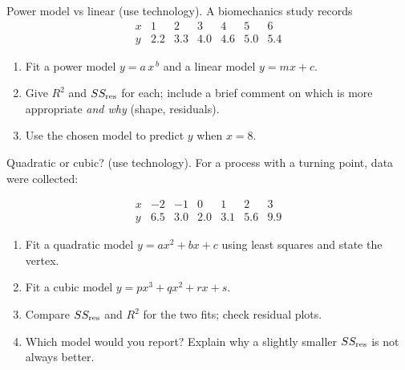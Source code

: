 \documentclass[11pt]{article}
\def\textbf#1{#1}%
\newcounter{question}
\begin{document}
\begin{question}
\textbf{Power model vs linear (use technology).}
A biomechanics study records
\[
\begin{array}{c|cccccc}
x & 1 & 2 & 3 & 4 & 5 & 6\\\hline
y & 2.2 & 3.3 & 4.0 & 4.6 & 5.0 & 5.4
\end{array}
\]
\begin{enumerate}
  \item Fit a power model $y=a\,x^{\,b}$ and a linear model $y=mx+c$.
  \item Give $R^2$ and $SS_{\rm res}$ for each; include a brief comment on which is more appropriate \emph{and why} (shape, residuals).
  \item Use the chosen model to predict $y$ when $x=8$.
\end{enumerate}

\begin{center}
\end{center}
\end{question}

\begin{question}
\textbf{Quadratic or cubic? (use technology).}
For a process with a turning point, data were collected:

\[
\begin{array}{c|cccccc}
x & -2 & -1 & 0 & 1 & 2 & 3\\\hline
y & 6.5 & 3.0 & 2.0 & 3.1 & 5.6 & 9.9
\end{array}
\]

\begin{enumerate}
  \item Fit a quadratic model $y=ax^2+bx+c$ using least squares and state the vertex.
  \item Fit a cubic model $y=px^3+qx^2+rx+s$.
  \item Compare $SS_{\rm res}$ and $R^2$ for the two fits; check residual plots.
  \item Which model would you report? Explain why a slightly smaller $SS_{\rm res}$ is not always better.
\end{enumerate}

\begin{center}
\end{center}
\end{question}
\end{document}
